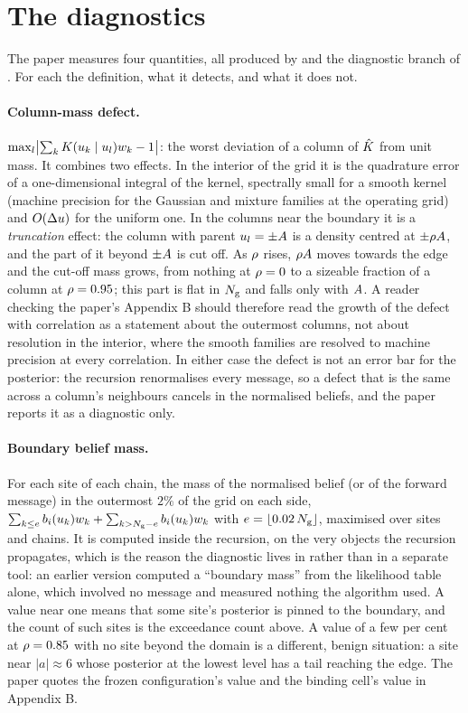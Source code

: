 \section{The diagnostics}
\label{sec:gq-diagnostics}

The paper measures four quantities, all produced by 
and the diagnostic branch of . For each the definition,
what it detects, and what it does not.

\paragraph{Column-mass defect.}
$\max_l\bigl|\sum_kK(u_{k}\mid u_{l})w_k-1\bigr|$: the worst deviation of a
column of $\hat{K}$ from unit mass. It combines two effects. In the interior of the
grid it is the quadrature error of a one-dimensional integral of the kernel, spectrally
small for a smooth kernel (machine precision for the Gaussian and mixture families at
the operating grid) and $O(\Delta u)$ for the uniform one. In the columns near the
boundary it is a \emph{truncation} effect: the column with parent $u_{l}=\pm A$
is a density centred at $\pm\rho A$, and the part of it beyond $\pm A$
is cut off. As $\rho$ rises, $\rho A$ moves towards the edge and the cut-off
mass grows, from nothing at $\rho=0$ to a sizeable fraction of a column at
$\rho=0.95$; this part is flat in $N_{\mathrm{g}}$ and falls only with $A$. A reader
checking the paper's Appendix B should therefore read the growth of the defect with
correlation as a statement about the outermost columns, not about resolution in the
interior, where the smooth families are resolved to machine precision at every
correlation. In either case the defect is not an error bar for the posterior: the
recursion renormalises every message, so a defect that is the same across a column's
neighbours cancels in the normalised beliefs, and the paper reports it as a diagnostic
only.

\paragraph{Boundary belief mass.}
For each site of each chain, the mass of the normalised belief (or of the forward
message) in the outermost $2\%$ of the grid on each side,
$\sum_{k\le e}b_i(u_{k})w_k+\sum_{k>N_{\mathrm{g}}-e}b_i(u_{k})w_k$ with
$e=\lfloor0.02\,N_{\mathrm{g}}\rfloor$, maximised over sites and chains. It is computed inside the
recursion, on the very objects the recursion propagates, which is the reason the
diagnostic lives in  rather than in a separate tool: an earlier
version computed a ``boundary mass'' from the likelihood table alone, which involved
no message and measured nothing the algorithm used. A value near one means that some
site's posterior is pinned to the boundary, and the count of such sites is the
exceedance count above. A value of a few per cent at $\rho=0.85$ with no site beyond
the domain is a different, benign situation: a site near $|a|\approx6$ whose posterior
at the lowest level has a tail reaching the edge. The paper quotes the frozen
configuration's value and the binding cell's value in Appendix B.

